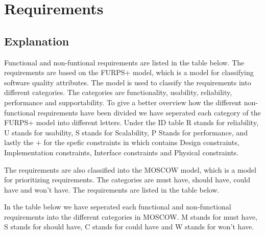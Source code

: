 
\section{Requirements}


\subsection{Explanation}
Functional and non-funtional requirements are listed in the table below. The requirements are based on the FURPS+ model, which is a model for classifying software quality attributes. The model is used to classify the requirements into different categories. The categories are functionality, usability, reliability, performance and supportability.
To give a better overview how the different non-functional requirements have been divided we have seperated each category of the FURPS+ model into different letters. Under the ID table R stands for reliability, U stands for usability, S stands for Scalability, P Stands for performance, and lastly the + for the spefic constraints in which contains Design constraints, Implementation constraints, Interface constraints and Physical constraints. \newline


\noindent The requirements are also classified into the MOSCOW model, which is a model for prioritizing requirements. The categories are must have, should have, could have and won't have. The requirements are listed in the table below. \newline

\noindent In the table below we have seperated each functional and non-functional requirements into the different categories in MOSCOW. M stands for must have, S stands for should have, C stands for could have and W stands for won't have. \newline


